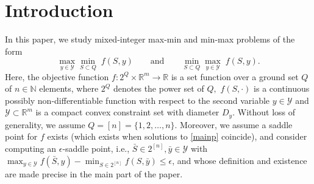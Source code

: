 \documentclass{article}
\theoremstyle{plain}
\theoremstyle{definition}
\theoremstyle{remark}
\newcommand{\R}{\mathbb{R}}
\newcommand{\N}{\mathbb{N}}
\begin{document}
\printAffiliationsAndNotice{}  %

\begin{abstract}
We consider max-min and min-max problems with objective functions that are possibly non-smooth, submodular with respect to the minimiser and concave with respect to the maximiser. We investigate the performance of a zeroth-order method applied to this problem. The method is based on the subgradient of the Lovász extension of the objective function with respect to the minimiser and based on Gaussian smoothing to estimate the smoothed function gradient with respect to the maximiser. In expectation sense, we prove the convergence of the algorithm to an $\epsilon$-saddle point in the offline case. Moreover, we show that, in the expectation sense, in the online setting, the algorithm achieves $O(\sqrt{N(1+\bar{P}_N)})$ online duality gap, where $N$ is the number of iterations and $\bar{P}_N$ is the path length of the sequence of optimal decisions. The complexity analysis and hyperparameter selection are presented for all the cases. The theoretical results are illustrated via numerical examples.
\end{abstract}

\section{Introduction}

In this paper, we study mixed-integer %
max-min and min-max 
problems of the form
	\begin{equation}\label{mainp}
		\underset{y \in \mathcal{Y}}{\max}\underset{S \subset Q}{\min}\;f(S,y)
    \qquad \text{and}
    \qquad
		\underset{S \subset Q}{\min}\underset{y \in \mathcal{Y}}{\max}\;f(S,y).
	\end{equation}
    Here, the objective function $f\colon 2^{Q}\times\mathbb{R}^m\rightarrow\mathbb{R}$ is a set function over a ground set $Q$ of $n\in \N$ elements, where $2^{Q}$ denotes the power set of $Q,$ 
    $f(S,\cdot)$ is a continuous possibly non-differentiable function with respect to the second variable $y\in\mathcal{Y}$ and %
    $\mathcal{Y}\subset \R^m$ is a compact convex constraint set with diameter $D_y.$ Without loss of generality, we assume $Q = [n] = \{1,2,\dots,n\}$. 
    Moreover, we %
    assume a saddle point for $f$ exists (which exists when solutions to \eqref{mainp} %
    coincide), 
    and consider computing an $\epsilon$-saddle point, %
    i.e., $\bar{S}\in 2^{[n]}, \bar{y}\in\mathcal{Y}$ with $\max_{y\in\mathcal{Y}}f(\bar{S},y) - \min_{S\in 2^{[n]}}f(S,\bar{y})\leq\epsilon$, 
    and whose definition and existence are made precise in the main part of the paper.
\end{document}
